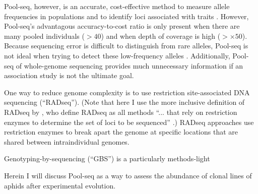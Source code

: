 Pool-seq, however, is an accurate, cost-effective method to measure allele frequencies
in populations \citep{Gautier:2013dv,Futschik:2010be}
and to identify loci associated with traits \citep{Rubin:2010es,Bastide:2013jx}.
However, Pool-seq's advantagous accuracy-to-cost ratio is only present when there
are many pooled individuals ($>40$) and when depth of coverage is high ($> \times 50$).
Because sequencing error is difficult to distinguish from rare alleles, 
Pool-seq is not ideal when trying to detect these low-frequency alleles
\citep{Schlotterer:2014dk}.
Additionally, Pool-seq of whole-genome sequencing provides much unnecessary 
information if an association study is not the ultimate goal.

One way to reduce genome complexity is to use restriction site-associated DNA 
sequencing (``RADseq'').
(Note that here I use the more inclusive definition of RADseq by
\citet{Andrews:2016bc}, who define RADseq as all methods 
``... that rely on restriction enzymes to determine the set of loci to be sequenced''
\citep[p 81]{Andrews:2016bc}.)
RADseq approaches use restriction enzymes to break apart the genome at specific 
locations that are shared between intraindividual genomes.

Genotyping-by-sequencing (``GBS'') is a particularly methods-light 
\citep{Elshire:2011gn}


Herein I will discuss Pool-seq as a way to assess the abundance of clonal lines of
aphids after experimental evolution.







\iffalse
\cite{Kofler:2011ds}

\citep{Elena:2003fr}

\citep{Schlotterer:2014jza}

\citep{Dettman:2012gt}




\citep{Jerison:2015kw}



\citep{Blount:2008fo}
\citep{Barrick:2009in}



